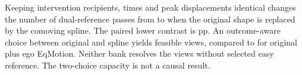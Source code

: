 Keeping \OpenSplineSlots{} intervention recipients, times and peak
displacements identical changes the number of dual-reference passes
from \OpenSplineOldDual{} to \OpenSplineSplineDual{} when the original
shape is replaced by the comoving spline. The paired lower contrast is
\OpenSplineSlotEffect{} pp. An outcome-aware choice between original and
spline yields \OpenSplineSplineCapacity{} feasible views, compared to
\OpenSplineEqCapacity{} for original plus ego EqMotion. Neither bank
resolves the \OpenSplineUndefined{} views without selected easy
reference. The two-choice capacity is not a causal result.
